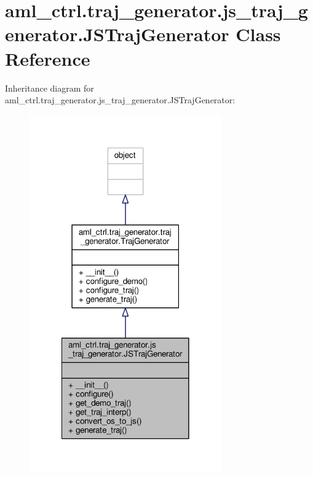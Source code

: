 \hypertarget{classaml__ctrl_1_1traj__generator_1_1js__traj__generator_1_1_j_s_traj_generator}{\section{aml\-\_\-ctrl.\-traj\-\_\-generator.\-js\-\_\-traj\-\_\-generator.\-J\-S\-Traj\-Generator Class Reference}
\label{classaml__ctrl_1_1traj__generator_1_1js__traj__generator_1_1_j_s_traj_generator}
}


Inheritance diagram for aml\-\_\-ctrl.\-traj\-\_\-generator.\-js\-\_\-traj\-\_\-generator.\-J\-S\-Traj\-Generator\-:
\nopagebreak
\begin{figure}[H]
\begin{center}
\leavevmode
\includegraphics[width=234pt]{classaml__ctrl_1_1traj__generator_1_1js__traj__generator_1_1_j_s_traj_generator__inherit__graph}
\end{center}
\end{figure}


